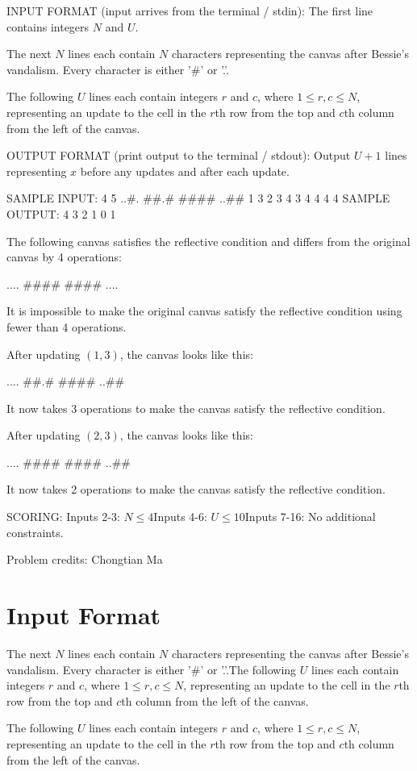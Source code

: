 \documentclass[12pt]{article}
\begin{document}
INPUT FORMAT (input arrives from the terminal / stdin):
The first line contains integers $N$ and $U$.

The next $N$ lines each contain $N$ characters representing the canvas after
Bessie's vandalism. Every character is either '#' or '.'.

The following $U$ lines each contain integers $r$ and $c$, where
$1 \leq r, c \leq N$, representing an update to the cell in the $r$th row from
the top and $c$th column from the left of the canvas.

OUTPUT FORMAT (print output to the terminal / stdout):
Output $U+1$ lines representing $x$ before any updates and after each update.

SAMPLE INPUT:
4 5
..#.
##.#
####
..##
1 3
2 3
4 3
4 4
4 4
SAMPLE OUTPUT: 
4
3
2
1
0
1

The following canvas satisfies the reflective condition and differs from the
original canvas by 4 operations:


....
####
####
....

It is impossible to make the original canvas satisfy the reflective condition
using fewer than 4 operations.

After updating $(1, 3)$, the canvas looks like this:


....
##.#
####
..##

It now takes 3 operations to make the canvas satisfy the reflective condition.

After updating $(2, 3)$, the canvas looks like this:


....
####
####
..##

It now takes 2 operations to make the canvas satisfy the reflective condition.

SCORING:
Inputs 2-3: $N \le 4$Inputs 4-6: $U \le 10$Inputs
7-16: No additional constraints.


Problem credits: Chongtian Ma



\section*{Input Format}
The next $N$ lines each contain $N$ characters representing the canvas after
Bessie's vandalism. Every character is either '#' or '.'.The following $U$ lines each contain integers $r$ and $c$, where
$1 \leq r, c \leq N$, representing an update to the cell in the $r$th row from
the top and $c$th column from the left of the canvas.

The following $U$ lines each contain integers $r$ and $c$, where
$1 \leq r, c \leq N$, representing an update to the cell in the $r$th row from
the top and $c$th column from the left of the canvas.
\end{document}

